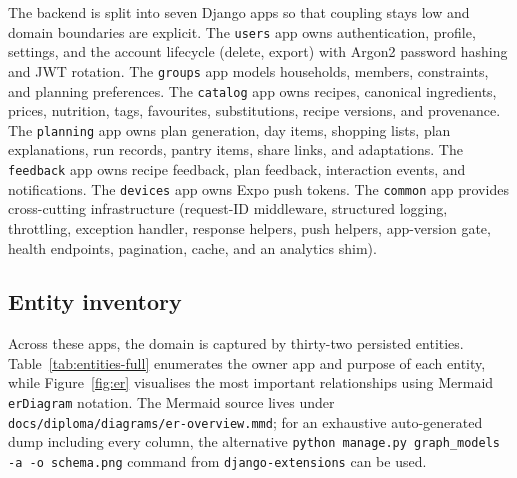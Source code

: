The backend is split into seven Django apps so that coupling stays low and domain boundaries are explicit. The \texttt{users} app owns authentication, profile, settings, and the account lifecycle (delete, export) with Argon2 password hashing and JWT rotation. The \texttt{groups} app models households, members, constraints, and planning preferences. The \texttt{catalog} app owns recipes, canonical ingredients, prices, nutrition, tags, favourites, substitutions, recipe versions, and provenance. The \texttt{planning} app owns plan generation, day items, shopping lists, plan explanations, run records, pantry items, share links, and adaptations. The \texttt{feedback} app owns recipe feedback, plan feedback, interaction events, and notifications. The \texttt{devices} app owns Expo push tokens. The \texttt{common} app provides cross-cutting infrastructure (request-ID middleware, structured logging, throttling, exception handler, response helpers, push helpers, app-version gate, health endpoints, pagination, cache, and an analytics shim).

\subsection{Entity inventory}

Across these apps, the domain is captured by thirty-two persisted entities. Table~\ref{tab:entities-full} enumerates the owner app and purpose of each entity, while Figure~\ref{fig:er} visualises the most important relationships using Mermaid \texttt{erDiagram} notation. The Mermaid source lives under \texttt{docs/diploma/diagrams/er-overview.mmd}; for an exhaustive auto-generated dump including every column, the alternative \texttt{python manage.py graph\_models -a -o schema.png} command from \texttt{django-extensions} can be used.

